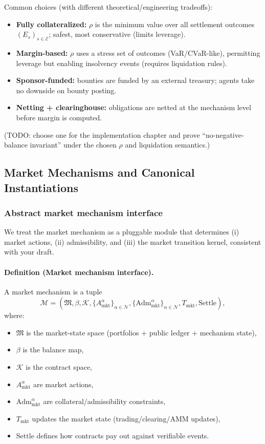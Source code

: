 Common choices (with different theoretical/engineering tradeoffs):
\begin{itemize}
\item \textbf{Fully collateralized:} \(\rho\) is the minimum value over all settlement outcomes \((E_s)_{s\in\mathcal{E}}\); safest, most conservative (limits leverage).
\item \textbf{Margin-based:} \(\rho\) uses a stress set of outcomes (VaR/CVaR-like), permitting leverage but enabling insolvency events (requires liquidation rules).
\item \textbf{Sponsor-funded:} bounties are funded by an external treasury; agents take no downside on bounty posting.
\item \textbf{Netting + clearinghouse:} obligations are netted at the mechanism level before margin is computed.
\end{itemize}

(TODO: choose one for the implementation chapter and prove ``no-negative-balance invariant'' under the chosen \(\rho\) and liquidation semantics.)

\subsection{Market Mechanisms and Canonical Instantiations}

\subsubsection{Abstract market mechanism interface}

We treat the market mechanism as a pluggable module that determines (i) market actions, (ii) admissibility, and (iii) the market transition kernel, consistent with your draft.

\paragraph{Definition (Market mechanism interface).}
A market mechanism is a tuple
\[
\mathcal{M}=
(\mathfrak{M},\beta,\mathcal{K},\{A^\alpha_{\mathrm{mkt}}\}_{\alpha\in\mathcal{N}},
\{\mathrm{Adm}^\alpha_{\mathrm{mkt}}\}_{\alpha\in\mathcal{N}},T_{\mathrm{mkt}},\mathrm{Settle}),
\]
where:
\begin{itemize}
\item \(\mathfrak{M}\) is the market-state space (portfolios + public ledger + mechanism state),
\item \(\beta\) is the balance map,
\item \(\mathcal{K}\) is the contract space,
\item \(A^\alpha_{\mathrm{mkt}}\) are market actions,
\item \(\mathrm{Adm}^\alpha_{\mathrm{mkt}}\) are collateral/admissibility constraints,
\item \(T_{\mathrm{mkt}}\) updates the market state (trading/clearing/AMM updates),
\item \(\mathrm{Settle}\) defines how contracts pay out against verifiable events.
\end{itemize}

